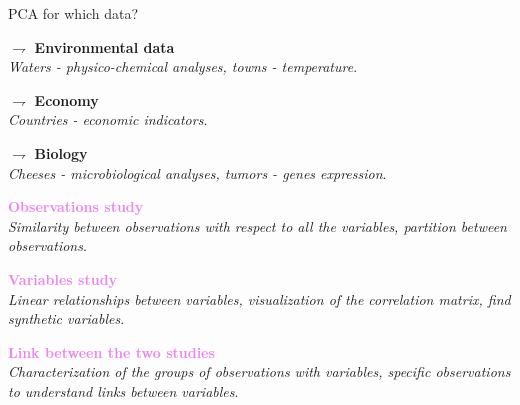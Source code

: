 \documentclass[9pt]{beamer}
\begin{document}

\begin{frame}{PCA for which data?}


$\rightharpoondown$ \textcolor{lighto}{{\bf Environmental data}}\\
{\em Waters - physico-chemical analyses, towns - temperature}.

$\rightharpoondown$  \textcolor{lighto}{{\bf Economy}}\\
{\em Countries - economic indicators}.

$\rightharpoondown$  \textcolor{lighto}{{\bf Biology}}\\
{\em Cheeses - microbiological analyses, tumors - genes expression}.

\vspace{.4cm}

\textcolor{violet}{{\bf Observations study}}\\ 
{\em Similarity between observations with respect to all the variables,  partition between observations}.

\textcolor{violet}{{\bf Variables study}}\\
{\em Linear relationships between variables, visualization of the correlation matrix, find synthetic variables}.

\textcolor{violet}{{\bf Link between the two studies}}\\ 
{\em Characterization of the groups of observations with variables, specific observations to understand links between variables}.

\end{frame}
\end{document}
